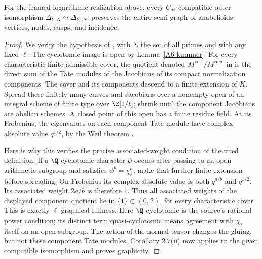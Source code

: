 \begin{lemma}\label{A6-graphic}
For the framed logarithmic realization above, every $G_K$-compatible outer isomorphism
$\Delta_{Y,N}\simeq\Delta_{Y',N'}$ preserves the entire semi-graph of anabelioids: vertices, nodes, cusps, and incidence.
\end{lemma}
\begin{proof}
We verify the hypothesis of \cite[Corollary 2.7(ii)]{Mochizuki2007A567}, with $\Sigma$ the set of all primes and with any fixed $\ell$. The cyclotomic image is open by Lemma~\ref{A6-kummer}. For every characteristic finite admissible cover, the quotient denoted
$M^{\mathrm{vert}}/M^{\mathrm{edge}}$ in \cite[Definition 2.3(iii)]{Mochizuki2007A567} is the direct sum of the Tate modules of the Jacobians of its compact normalization components. The cover and its components descend to a finite extension of $K$. Spread these finitely many curves and Jacobians over a nonempty open of an integral scheme of finite type over $\Z[1/\ell]$; shrink until the component Jacobians are abelian schemes. A closed point of this open has a finite residue field. At its Frobenius, the eigenvalues on each component Tate module have complex absolute value $q^{1/2}$, by the Weil theorem \cite[II, Theorem 1.1(b)]{MilneAVA567}.

Here is why this verifies the precise associated-weight condition of the cited definition. If a $\Q$-cyclotomic character $\psi$ occurs after passing to an open arithmetic subgroup and satisfies $\psi^b=\chi_\ell^a$, make that further finite extension before spreading. On Frobenius its complex absolute value is both $q^{a/b}$ and $q^{1/2}$. Its associated weight $2a/b$ is therefore $1$. Thus all associated weights of the displayed component quotient lie in $\{1\}\subset(0,2)$, for every characteristic cover. This is exactly $\ell$-graphical fullness. Here $\Q$-cyclotomic is the source's rational-power condition; its distinct term quasi-cyclotomic means agreement with $\chi_\ell$ itself on an open subgroup. The action of the normal tensor changes the gluing, but not these component Tate modules. Corollary 2.7(ii) now applies to the given compatible isomorphism and proves graphicity.
\end{proof}

